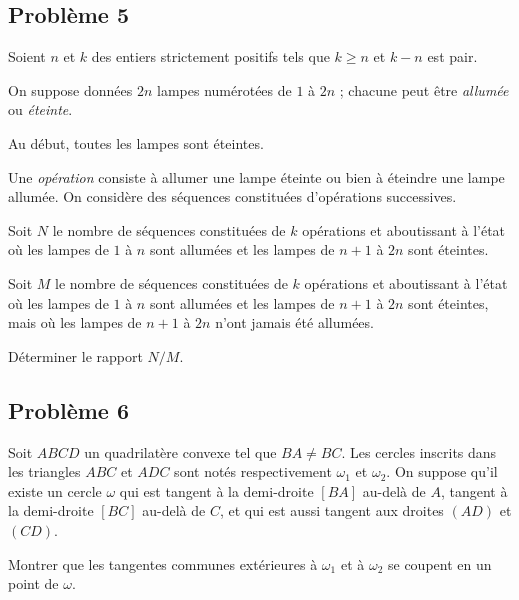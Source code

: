 \subsection*{Problème 5}
Soient $n$ et $k$ des entiers strictement positifs tels que $k \geqslant n$ et $k - n$ est pair.

On suppose données $2n$ lampes numérotées de $1$ à $2n$ ; chacune peut être \emph{allumée} ou \emph{éteinte}.

Au début, toutes les lampes sont éteintes.

Une \emph{opération} consiste à allumer une lampe éteinte ou bien à éteindre une lampe allumée. On considère des
séquences constituées d'opérations successives.

Soit $N$ le nombre de séquences constituées de $k$ opérations et aboutissant à l'état où les lampes de $1$ à
$n$ sont allumées et les lampes de $n + 1$ à $2n$ sont éteintes.

Soit $M$ le nombre de séquences constituées de $k$ opérations et aboutissant à l'état où les lampes de $1$ à
$n$ sont allumées et les lampes de $n + 1$ à $2n$ sont éteintes, mais où les lampes de $n + 1$ à $2n$ n'ont
jamais été allumées.

Déterminer le rapport $N/M$.

\subsection*{Problème 6}
Soit $ABCD$ un quadrilatère convexe tel que $BA \neq BC$. Les cercles inscrits dans les triangles $ABC$ et
$ADC$ sont notés respectivement $\omega_1$ et $\omega_2$. On suppose qu'il existe un cercle $\omega$ qui est
tangent à la demi-droite $[BA]$ au-delà de $A$, tangent à la demi-droite $[BC]$ au-delà de $C$, et qui est
aussi tangent aux droites $(AD)$ et $(CD)$.

Montrer que les tangentes communes extérieures à $\omega_1$ et à $\omega_2$ se coupent en un point de $\omega$.
